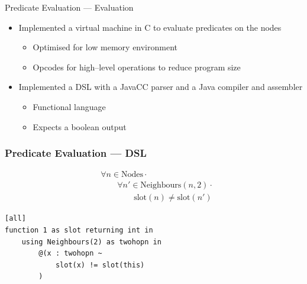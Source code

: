 \documentclass[usenames,dvipsnames]{beamer}
\begin{document}
\begin{frame}{Predicate Evaluation --- Evaluation}
\begin{itemize}
	\item Implemented a virtual machine in C to evaluate predicates on the nodes
		\begin{itemize}
			\item Optimised for low memory environment
			\item Opcodes for high--level operations to reduce program size
		\end{itemize}
	\vspace{1em}
	\item Implemented a DSL with a JavaCC parser and a Java compiler and assembler
		\begin{itemize}
			\item Functional language
			\item Expects a boolean output
		\end{itemize}
\end{itemize}
\end{frame}


\begin{frame}[fragile]\frametitle{Predicate Evaluation --- DSL}
\begin{align*}
&				\forall n \in \text{Nodes} \cdot \\
& \hspace{2em}		\forall n' \in \text{Neighbours}(n, 2) \cdot \\
& \hspace{4em}				\text{slot}(n) \neq \text{slot}(n')
\end{align*}

\begin{center}
\begin{minipage}{0.75\textwidth}
\begin{lstlisting}[language=Hoppy]
[all]
function 1 as slot returning int in
    using Neighbours(2) as twohopn in
        @(x : twohopn ~
            slot(x) != slot(this)
        )
\end{lstlisting}
\end{minipage}
\end{center}
\end{frame}
\end{document}
